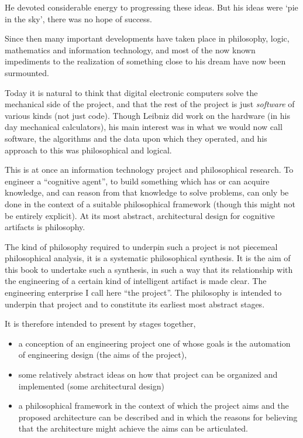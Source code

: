 He devoted considerable energy to progressing these ideas.
But his ideas were `pie in the sky', there was no hope of success.

Since then many important developments have taken place in philosophy,
logic, mathematics and information technology, and most of the now known
impediments to the realization of something close to his dream have
now been surmounted.

Today it is natural to think that digital electronic computers solve the mechanical side
of the project, and that the rest of the project is just \emph{software} of
various kinds (not just code).
Though Leibniz did work on the hardware (in his day mechanical
calculators), his main interest was in what we would now call software,
the algorithms and the data upon which they operated, and his approach
to this was philosophical and logical.
 
This is at once an information technology project and philosophical research.
To engineer a ``cognitive agent'', to build something which has or can
acquire knowledge, and can reason from that knowledge to solve
problems, can only be done in the context of a suitable philosophical
framework (though this might not be entirely explicit).
At its most abstract, architectural design for cognitive artifacts is
philosophy.

The kind of philosophy required to underpin such a project is not
piecemeal philosophical analysis, it is a systematic philosophical
synthesis.
It is the aim of this book to undertake such a synthesis, in such a
way that its relationship with the engineering of a certain kind of
intelligent artifact is made clear.
The engineering enterprise I call here ``the project''.
The philosophy is intended to underpin that project and to constitute
its earliest most abstract stages.

It is therefore intended to present by stages together,
\begin{itemize}
\item a conception of an engineering project one of whose goals is the
  automation of engineering design (the aims of the project),
\item some relatively abstract ideas on how that project can be
  organized and implemented (some architectural design)
\item a philosophical framework in the context of which the project
  aims and the proposed architecture can be described and in which the
  reasons for believing that the architecture might achieve the aims
  can be articulated.
\end{itemize}


